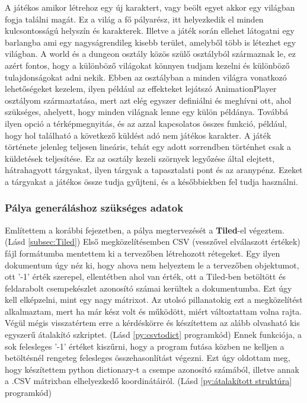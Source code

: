  A játékos amikor létrehoz egy új karaktert, vagy beölt egyet akkor egy világban fogja találni magát. Ez a világ a fő pályarész, itt helyezkedik el minden kulcsontosságú helyszín és karakterek. Illetve a játék során ellehet látogatni egy barlangba ami egy nagyságrendileg kisebb terület, amelyből több is létezhet egy világban.
 A world és a dungeon osztály közös szülő osztályból származnak le, ez azért fontos, hogy a különböző világokat könnyen tudjam kezelni
 és különböző tulajdonságokat adni nekik. Ebben az osztályban a minden világra vonatkozó lehetőségeket kezelem, ilyen például
  az effekteket lejátszó AnimationPlayer osztályom származtatása, mert azt elég egyszer definiálni és meghívni ott, ahol szükséges, ahelyett,
   hogy minden világnak lenne egy külön példánya. Továbbá ilyen opció a térképmegnyitás, és az azzal kapcsolatos összes funkció,
    például, hogy hol található a következő küldést adó nem játékos karakter. A játék története jelenleg teljesen lineáris,
     tehát egy adott sorrendben történhet csak a küldetések teljesítése. Ez az osztály kezeli szörnyek legyőzése által elejtett, hátrahagyott tárgyakat, ilyen tárgyak a tapasztalati pont és az aranypénz.
       Ezeket a tárgyakat a játékos össze tudja gyűjteni, és a későbbiekben fel tudja használni.  

\subsubsection{Pálya generáláshoz szükséges adatok} \label {subsec:Pálya generáláshoz szükséges adatok}

 Említettem a korábbi fejezetben, a pálya megtervezését a \textbf{Tiled}-el végeztem. (Lásd \ref{subsec:Tiled}) 
Első megközelítésemben CSV (vesszővel elválaszott értékek) fájl formátumba mentettem ki a tervezőben létrehozott rétegeket. Egy ilyen dokumentum úgy néz ki, hogy ahova nem helyeztem le a tervezőben objektumot, ott '-1' érték szerepel, ellentétben ahol van érték, ott a Tiled-ben betöltött és feldarabolt csempekészlet azonosító számai kerültek a dokumentumba. Ezt úgy kell elképzelni, mint egy nagy mátrixot. Az utolsó pillanatokig ezt a megközelítést alkalmaztam, mert ha már kész volt és működött, miért változtattam volna rajta. Végül mégis visszatértem erre a kérdéskörre és készítettem az alább olvasható kis egyszerű átalakító szkriptet. (Lásd \ref{py:csvtodict} programkód) Ennek funkciója, a sok felesleges '-1' értéket kiszűrni, hogy a program futása közben ne kelljen a betöltésnél rengeteg felesleges összehasonlítást végezni. Ezt úgy oldottam meg, hogy készítettem python dictionary-t a csempe azonosító számából, illetve annak a .CSV mátrixban elhelyezkedő koordinátáiról. (Lásd \ref{py:átalakított struktúra} programkód)


